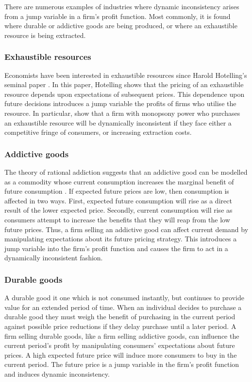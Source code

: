 There are numerous examples of industries where dynamic inconsistency arises
from a jump variable in a firm's profit function. Most commonly, it is found
where durable or addictive goods are being produced, or where an exhaustible
resource is being extracted.

\subsubsection{Exhaustible resources}

\label{sec:exha-reso} Economists have been interested in exhaustible
resources since Harold Hotelling's seminal paper \citep{Hotelling1931}. In
this paper, Hotelling shows that the pricing of an exhaustible resource
depends upon expectations of subsequent prices. This dependence upon future
decisions introduces a jump variable the profits of firms who utilise the
resource. In particular, \citet{Karp1993a} show that a firm with monopsony
power who purchases an exhaustible resource will be dynamically inconsistent
if they face either a competitive fringe of consumers, or increasing
extraction costs.

\subsubsection{Addictive goods}

\label{sec:addictive-goods}

The theory of rational addiction suggests that an addictive good can be
modelled as a commodity whose current consumption increases the marginal
benefit of future consumption \citep{Becker1988}. If expected future prices
are low, then consumption is affected in two ways. First, expected future
consumption will rise as a direct result of the lower expected price.
Secondly, current consumption will rise as consumers attempt to increase the
benefits that they will reap from the low future prices. Thus, a firm
selling an addictive good can affect current demand by manipulating
expectations about its future pricing strategy. This introduces a jump
variable into the firm's profit function and causes the firm to act in a
dynamically inconsistent fashion.

\subsubsection{Durable goods}

\label{sec:durable-goods} A durable good it one which is not consumed
instantly, but continues to provide value for an extended period of time.
When an individual decides to purchase a durable good they must weigh the
benefit of purchasing in the current period against possible price
reductions if they delay purchase until a later period. A firm selling
durable goods, like a firm selling addictive goods, can influence the
current period's profit by manipulating consumers' expectations about future
prices. A high expected future price will induce more consumers to buy in
the current period. The future price is a jump variable in the firm's profit
function and induces dynamic inconsistency.


